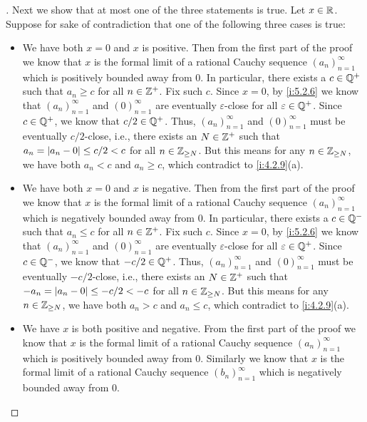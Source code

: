 \begin{proof}[]
  Next we show that at most one of the three statements is true.
  Let \(x \in \mathbb{R}\).
  Suppose for sake of contradiction that one of the following three cases is true:
  \begin{itemize}
    \item We have both \(x = 0\) and \(x\) is positive.
          Then from the first part of the proof we know that \(x\) is the formal limit of a rational Cauchy sequence \((a_n)_{n = 1}^\infty\) which is positively bounded away from \(0\).
          In particular, there exists a \(c \in \mathbb{Q}^+\) such that \(a_n \geq c\) for all \(n \in \mathbb{Z}^+\).
          Fix such \(c\).
          Since \(x = 0\), by \cref{i:5.2.6} we know that \((a_n)_{n = 1}^\infty\) and \((0)_{n = 1}^\infty\) are eventually \(\varepsilon\)-close for all \(\varepsilon \in \mathbb{Q}^+\).
          Since \(c \in \mathbb{Q}^+\), we know that \(c / 2 \in \mathbb{Q}^+\).
          Thus, \((a_n)_{n = 1}^\infty\) and \((0)_{n = 1}^\infty\) must be eventually \(c / 2\)-close, i.e., there exists an \(N \in \mathbb{Z}^+\) such that \(a_n = \left\lvert a_n - 0\right\rvert \leq c / 2 < c\) for all \(n \in \mathbb{Z}_{\geq N}\).
          But this means for any \(n \in \mathbb{Z}_{\geq N}\), we have both \(a_n < c\) and \(a_n \geq c\), which contradict to \cref{i:4.2.9}(a).
    \item We have both \(x = 0\) and \(x\) is negative.
          Then from the first part of the proof we know that \(x\) is the formal limit of a rational Cauchy sequence \((a_n)_{n = 1}^\infty\) which is negatively bounded away from \(0\).
          In particular, there exists a \(c \in \mathbb{Q}^-\) such that \(a_n \leq c\) for all \(n \in \mathbb{Z}^+\).
          Fix such \(c\).
          Since \(x = 0\), by \cref{i:5.2.6} we know that \((a_n)_{n = 1}^\infty\) and \((0)_{n = 1}^\infty\) are eventually \(\varepsilon\)-close for all \(\varepsilon \in \mathbb{Q}^+\).
          Since \(c \in \mathbb{Q}^-\), we know that \(-c / 2 \in \mathbb{Q}^+\).
          Thus, \((a_n)_{n = 1}^\infty\) and \((0)_{n = 1}^\infty\) must be eventually \(-c / 2\)-close, i.e., there exists an \(N \in \mathbb{Z}^+\) such that \(-a_n = \left\lvert a_n - 0\right\rvert \leq -c / 2 < -c\) for all \(n \in \mathbb{Z}_{\geq N}\).
          But this means for any \(n \in \mathbb{Z}_{\geq N}\), we have both \(a_n > c\) and \(a_n \leq c\), which contradict to \cref{i:4.2.9}(a).
    \item We have \(x\) is both positive and negative.
          From the first part of the proof we know that \(x\) is the formal limit of a rational Cauchy sequence \((a_n)_{n = 1}^\infty\) which is positively bounded away from \(0\).
          Similarly we know that \(x\) is the formal limit of a rational Cauchy sequence \((b_n)_{n = 1}^\infty\) which is negatively bounded away from \(0\).

\end{itemize}
\end{proof}
